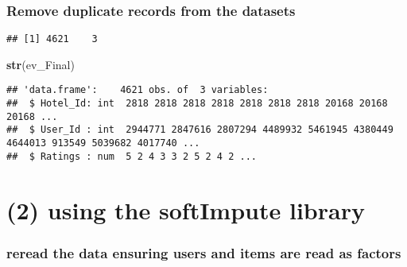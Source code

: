 \documentclass[]{article}
\newenvironment{Shaded}{\begin{snugshade}}{\end{snugshade}}
\newcommand{\DataTypeTok}[1]{\textcolor[rgb]{0.13,0.29,0.53}{#1}}
\newcommand{\KeywordTok}[1]{\textcolor[rgb]{0.13,0.29,0.53}{\textbf{#1}}}
\newcommand{\NormalTok}[1]{#1}
\newcommand{\OperatorTok}[1]{\textcolor[rgb]{0.81,0.36,0.00}{\textbf{#1}}}
\newcommand{\OtherTok}[1]{\textcolor[rgb]{0.56,0.35,0.01}{#1}}
\newcommand{\StringTok}[1]{\textcolor[rgb]{0.31,0.60,0.02}{#1}}
\begin{document}
\hypertarget{remove-duplicate-records-from-the-datasets}{%
\subsubsection{Remove duplicate records from the
datasets}\label{remove-duplicate-records-from-the-datasets}}

\begin{Shaded}
\end{Shaded}

\begin{verbatim}
## [1] 4621    3
\end{verbatim}

\begin{Shaded}
\begin{Highlighting}[]
\KeywordTok{str}\NormalTok{(ev_Final)}
\end{Highlighting}
\end{Shaded}

\begin{verbatim}
## 'data.frame':    4621 obs. of  3 variables:
##  $ Hotel_Id: int  2818 2818 2818 2818 2818 2818 2818 20168 20168 20168 ...
##  $ User_Id : int  2944771 2847616 2807294 4489932 5461945 4380449 4644013 913549 5039682 4017740 ...
##  $ Ratings : num  5 2 4 3 3 2 5 2 4 2 ...
\end{verbatim}

\hypertarget{using-the-softimpute-library}{%
\section{(2) using the softImpute
library}\label{using-the-softimpute-library}}

\hypertarget{reread-the-data-ensuring-users-and-items-are-read-as-factors}{%
\subsubsection{reread the data ensuring users and items are read as
factors}\label{reread-the-data-ensuring-users-and-items-are-read-as-factors}}
\end{document}
